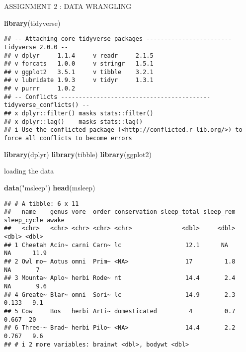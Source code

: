 \documentclass[
]{article}
\author{}
\date{\vspace{-2.5em}}
\newenvironment{Shaded}{\begin{snugshade}}{\end{snugshade}}
\newcommand{\FunctionTok}[1]{\textcolor[rgb]{0.13,0.29,0.53}{\textbf{#1}}}
\newcommand{\NormalTok}[1]{#1}
\newcommand{\StringTok}[1]{\textcolor[rgb]{0.31,0.60,0.02}{#1}}
\begin{document}
ASSIGNMENT 2 : DATA WRANGLING

\begin{Shaded}
\begin{Highlighting}[]
\FunctionTok{library}\NormalTok{(tidyverse)}
\end{Highlighting}
\end{Shaded}

\begin{verbatim}
## -- Attaching core tidyverse packages ------------------------ tidyverse 2.0.0 --
## v dplyr     1.1.4     v readr     2.1.5
## v forcats   1.0.0     v stringr   1.5.1
## v ggplot2   3.5.1     v tibble    3.2.1
## v lubridate 1.9.3     v tidyr     1.3.1
## v purrr     1.0.2     
## -- Conflicts ------------------------------------------ tidyverse_conflicts() --
## x dplyr::filter() masks stats::filter()
## x dplyr::lag()    masks stats::lag()
## i Use the conflicted package (<http://conflicted.r-lib.org/>) to force all conflicts to become errors
\end{verbatim}

\begin{Shaded}
\begin{Highlighting}[]
\FunctionTok{library}\NormalTok{(dplyr)}
\FunctionTok{library}\NormalTok{(tibble)}
\FunctionTok{library}\NormalTok{(ggplot2)}
\end{Highlighting}
\end{Shaded}

loading the data

\begin{Shaded}
\begin{Highlighting}[]
\FunctionTok{data}\NormalTok{(}\StringTok{"msleep"}\NormalTok{)}
\FunctionTok{head}\NormalTok{(msleep)}
\end{Highlighting}
\end{Shaded}

\begin{verbatim}
## # A tibble: 6 x 11
##   name    genus vore  order conservation sleep_total sleep_rem sleep_cycle awake
##   <chr>   <chr> <chr> <chr> <chr>              <dbl>     <dbl>       <dbl> <dbl>
## 1 Cheetah Acin~ carni Carn~ lc                  12.1      NA        NA      11.9
## 2 Owl mo~ Aotus omni  Prim~ <NA>                17         1.8      NA       7  
## 3 Mounta~ Aplo~ herbi Rode~ nt                  14.4       2.4      NA       9.6
## 4 Greate~ Blar~ omni  Sori~ lc                  14.9       2.3       0.133   9.1
## 5 Cow     Bos   herbi Arti~ domesticated         4         0.7       0.667  20  
## 6 Three-~ Brad~ herbi Pilo~ <NA>                14.4       2.2       0.767   9.6
## # i 2 more variables: brainwt <dbl>, bodywt <dbl>
\end{verbatim}
\end{document}

